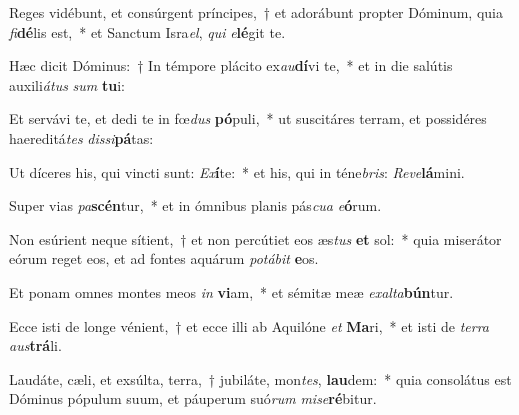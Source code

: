 \item Reges vidébunt, et consúrgent príncipes,~† et adorábunt propter Dóminum, quia \textit{fi}\textbf{dé}lis est,~* et Sanctum Isra\textit{el}, \textit{qui} \textit{e}\textbf{lé}git te.
\item Hæc dicit Dóminus:~† In témpore plácito ex\textit{au}\textbf{dí}vi te,~* et in die salútis auxili\textit{á}\textit{tus} \textit{sum} \textbf{tu}i:
\item Et servávi te, et dedi te in fœ\textit{dus} \textbf{pó}puli,~* ut suscitáres terram, et possidéres haereditá\textit{tes} \textit{dis}\textit{si}\textbf{pá}tas:
\item Ut díceres his, qui vincti sunt: \textit{Ex}\textbf{í}te:~* et his, qui in téne\textit{bris}: \textit{Re}\textit{ve}\textbf{lá}mini.
\item Super vias \textit{pa}\textbf{scén}tur,~* et in ómnibus planis pás\textit{cu}\textit{a} \textit{e}\textbf{ó}rum.
\item Non esúrient neque sítient,~† et non percútiet eos æs\textit{tus} \textbf{et} sol:~* quia miserátor eórum reget eos, et ad fontes aquárum \textit{po}\textit{tá}\textit{bit} \textbf{e}os.
\item Et ponam omnes montes meos \textit{in} \textbf{vi}am,~* et sémitæ meæ \textit{ex}\textit{al}\textit{ta}\textbf{bún}tur.
\item Ecce isti de longe vénient,~† et ecce illi ab Aquilóne \textit{et} \textbf{Ma}ri,~* et isti de \textit{ter}\textit{ra} \textit{aus}\textbf{trá}li.
\item Laudáte, cæli, et exsúlta, terra,~† jubiláte, mon\textit{tes}, \textbf{lau}dem:~* quia consolátus est Dóminus pópulum suum, et páuperum suó\textit{rum} \textit{mi}\textit{se}\textbf{ré}bitur.
